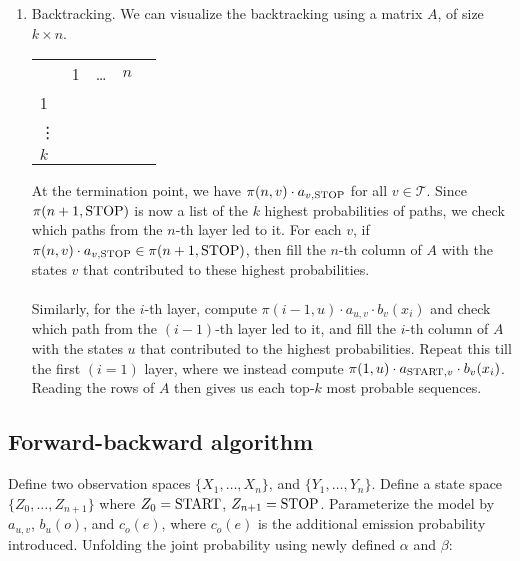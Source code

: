 \documentclass[9pt,twocolumn]{article}
\newcommand{\START}{\text{\lstinline{START}}}
\newcommand{\STOP}{\text{\lstinline{STOP}}}
\begin{document}
\begin{enumerate}
            \item
                Backtracking. We can visualize the backtracking using a matrix $A$, of size $k\times n$.\\
                \begin{center}
                \begin{tabular}{lcccc} 
                    \toprule
                     & 1 & \ldots & $n$ \\
                    1 & & & \\
                    \vdots & & & \\
                    $k$ & & & \\
                    \bottomrule
                \end{tabular}
                \end{center}
                At the termination point, we have $\pi(n,v)\cdot a_{v,\STOP}$ for all $v \in \mathcal{T}$. Since $\pi(n+1, \STOP)$ is now a list of the $k$ highest probabilities of paths, we check which paths from the $n$-th layer led to it. For each $v$, if $\pi(n,v)\cdot a_{v,\STOP} \in \pi(n+1, \STOP)$, then fill the $n$-th column of $A$ with the states $v$ that contributed to these highest probabilities.\\ \\
                Similarly, for the $i$-th layer, compute $\pi(i-1,u)\cdot a_{u,v} \cdot b_v(x_i)$ and check which path from the $(i-1)$-th layer led to it, and fill the $i$-th column of $A$ with the states $u$ that contributed to the highest probabilities. Repeat this till the first $(i=1)$ layer, where we instead compute $\pi(1,u) \cdot a_{\START,v} \cdot b_v(x_i)$. Reading the rows of $A$ then gives us each top-$k$ most probable sequences.
            \end{enumerate}

        \subsection*{Forward-backward algorithm}
            Define two observation spaces $\{X_1, \ldots, X_n\}$, and $\{Y_1, \ldots, Y_n\}$. Define a state space $\{Z_0, \ldots, Z_{n+1}\}$ where $Z_0 = \START$, $Z_{n+1} = \STOP$. Parameterize the model by $a_{u,v}$, $b_u(o)$, and $c_o(e)$, where $c_o(e)$ is the additional emission probability introduced. Unfolding the joint probability using newly defined $\alpha$ and $\beta$:
\end{document}
